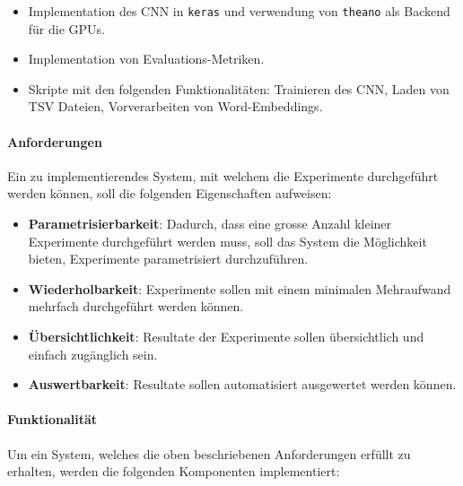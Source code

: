 \begin{itemize}[noitemsep]
	\item Implementation des CNN in \texttt{keras} und verwendung von \texttt{theano} \cite{theanoCitShort} als Backend für die \gls{GPU}s.
	\item Implementation von Evaluations-Metriken.
	\item Skripte mit den folgenden Funktionalitäten: Trainieren des CNN, Laden von TSV Dateien, Vorverarbeiten von Word-Embeddings.
\end{itemize}

\paragraph{Anforderungen}
\label{technical_setup:requirements}
Ein zu implementierendes System, mit welchem die Experimente durchgeführt werden können, soll die folgenden Eigenschaften aufweisen:

\begin{itemize}
	\item \textbf{Parametrisierbarkeit}: Dadurch, dass eine grosse Anzahl kleiner Experimente durchgeführt werden muss, soll das System die Möglichkeit bieten, Experimente parametrisiert durchzuführen.
	\item \textbf{Wiederholbarkeit}: Experimente sollen mit einem minimalen Mehraufwand mehrfach durchgeführt werden können.
	\item \textbf{Übersichtlichkeit}: Resultate der Experimente sollen übersichtlich und einfach zugänglich sein.
	\item \textbf{Auswertbarkeit}: Resultate sollen automatisiert ausgewertet werden können.
\end{itemize}

\paragraph{Funktionalität}
\label{technical_setup:functionality}
Um ein System, welches die oben beschriebenen Anforderungen erfüllt zu erhalten, werden die folgenden Komponenten implementiert:

